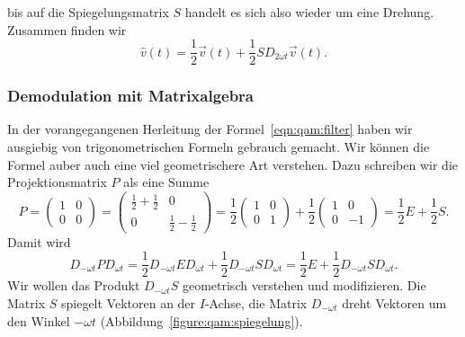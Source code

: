 bis auf die Spiegelungsmatrix $S$ handelt es sich also wieder um eine
Drehung.
Zusammen finden wir
\begin{equation}
\hat{v}(t)
=
\frac12 \vec{v}(t)
+
\frac12 SD_{2\omega t}\vec{v}(t).
\label{eqn:qam:filter}
\end{equation}

\subsubsection{Demodulation mit Matrixalgebra}
In der vorangegangenen Herleitung der Formel~\eqref{eqn:qam:filter}
haben wir ausgiebig von trigonometrischen Formeln gebrauch gemacht.
Wir können die Formel auber auch eine viel geometrischere Art verstehen.
Dazu schreiben wir die Projektionsmatrix $P$ als eine Summe
\[
P
=
\begin{pmatrix}1&0\\0&0\end{pmatrix}
=
\begin{pmatrix}\frac12+\frac12&0\\0&\frac12-\frac12\end{pmatrix}
=
\frac12\begin{pmatrix}1&0\\0&1\end{pmatrix}
+
\frac12\begin{pmatrix}1&0\\0&-1\end{pmatrix}
=
\frac12E+\frac12S.
\]
Damit wird
\[
D_{-\omega t}PD_{\omega t}
=
\frac12D_{-\omega t}ED_{\omega t}
+
\frac12D_{-\omega t}SD_{\omega t}
=
\frac12E
+
\frac12D_{-\omega t}SD_{\omega t}.
\]
Wir wollen das Produkt $D_{-\omega t}S$ geometrisch verstehen und
modifizieren.
Die Matrix $S$ spiegelt Vektoren an der $I$-Achse, die Matrix $D_{-\omega t}$
dreht Vektoren um den Winkel $-\omega t$
(Abbildung~\ref{figure:qam:spiegelung}).
